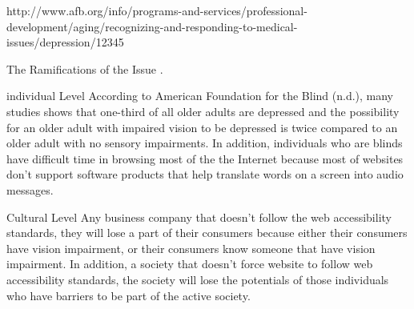\documentclass[11pt, titlepage]{article}
\newenvironment{index_me} {
	\begin{adjustwidth}{2cm}{}
}{\end{adjustwidth}}
\newenvironment{doc_heading}[1]
{
     \section*{\sffamily \LARGE \capitalisewords{#1}}
}{}
\newenvironment{doc_subheading}[1]
{
	\begin{index_me}
    \subsection*{\sffamily\Large \capitalisewords{#1}}
}{\end{index_me}}
\begin{document}
http://www.afb.org/info/programs-and-services/professional-development/aging/recognizing-and-responding-to-medical-issues/depression/12345
\fi


\begin{doc_heading}{The Ramifications of the Issue}
\color{white}.\vspace{-0.5in}\color{black}
  \begin{doc_subheading}{individual Level}
  	According to American Foundation for the Blind (n.d.), many studies shows that one-third of all older adults are depressed and the possibility for an older adult with impaired vision to be depressed is twice compared to an older adult with no sensory impairments. In addition, individuals who are blinds have difficult time in browsing most of the the Internet because most of websites don't support software products that help translate words on a screen into audio messages.
  \end{doc_subheading}
  \begin{doc_subheading}{Cultural Level}
  	Any business company that doesn't follow the web accessibility standards, they will lose a part of their consumers because either their consumers have vision impairment, or their consumers know someone that have vision impairment. In addition, a society that doesn't force website to follow web accessibility standards, the society will lose the potentials of those individuals who have barriers to be part of the active society.
  \end{doc_subheading}
\end{doc_heading}




\iffalse
Sources:

https://mashable.com/2011/04/20/design-for-visually-impaired/#TmeefOmvYPqC

http://www.afb.org/info/programs-and-services/afb-consulting-services/afb-accessibility-resources/123
https://www.hobo-web.co.uk/design-website-for-blind/#-rnib-royal-national-institute-for-the-blind

https://www.livestrong.com/article/241936-challenges-that-blind-people-face/

\fi
\end{document}
